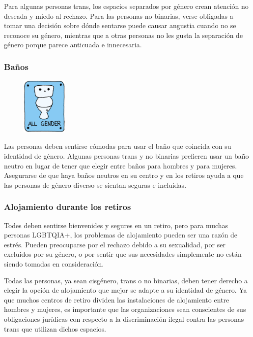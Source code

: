 \documentclass[12pt,openany]{book}
\begin{document}
Para algunas personas trans, los espacios separados por género crean atención no deseada y miedo al rechazo. Para las personas no binarias, verse obligadas a tomar una decisión sobre dónde sentarse puede causar angustia cuando no se reconoce su género, mientras que a otras personas no les gusta la separación de género porque parece anticuada e innecesaria.

\subsubsection*{Baños}

\begin{figure}
    \centering
    \includegraphics[width=0.2\textwidth]{16.png}
\end{figure}
Las personas deben sentirse cómodas para usar el baño que coincida con su identidad de género. Algunas personas trans y no binarias prefieren usar un baño neutro en lugar de tener que elegir entre baños para hombres y para mujeres. Asegurarse de que haya baños neutros en su centro y en los retiros ayuda a que las personas de género diverso se sientan seguras e incluidas.

\subsubsection*{Alojamiento durante los retiros}

Todes deben sentirse bienvenides y segures en un retiro, pero para muchas personas LGBTQIA+, los problemas de alojamiento pueden ser una razón de estrés. Pueden preocuparse por el rechazo debido a su sexualidad,  por ser excluidos por su género, o por sentir que sus necesidades simplemente no están siendo tomadas en consideración.

Todas las personas, ya sean cisgénero, trans o no binarias, deben tener derecho a elegir la opción de alojamiento que mejor se adapte a su identidad de género.
Ya que muchos centros de retiro dividen las instalaciones de alojamiento entre hombres y mujeres, es importante que las organizaciones sean conscientes de sus obligaciones jurídicas con respecto a la discriminación ilegal contra las personas trans que utilizan dichos espacios.
\end{document}
